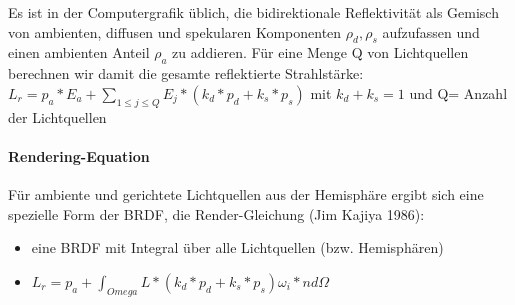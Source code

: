 \documentclass[10pt,landscape]{article}
\begin{document}
\begin{multicols}{3}
Es ist in der Computergrafik üblich, die bidirektionale Reflektivität als Gemisch von ambienten, diffusen und spekularen Komponenten $\rho_d, \rho_s$ aufzufassen und
einen ambienten Anteil $\rho_a$ zu addieren. Für eine Menge Q von Lichtquellen berechnen wir damit die gesamte reflektierte Strahlstärke: $L_r=p_a*E_a+\sum_{1\leq j \leq Q} E_j * (k_d*p_d + k_s*p_s)$ mit $k_d+k_s=1$ und Q= Anzahl der Lichtquellen

\paragraph{Rendering-Equation}
Für ambiente und gerichtete Lichtquellen aus der Hemisphäre ergibt sich eine spezielle Form der BRDF, die Render-Gleichung (Jim Kajiya 1986):
\begin{itemize}
  \item eine BRDF mit Integral über alle Lichtquellen (bzw. Hemisphären)
  \item $L_r=p_a + \int_{Omega} L*(k_d*p_d+k_s*p_s) \omega_i*n d\Omega$
\end{itemize}



\end{multicols}
\end{document}
